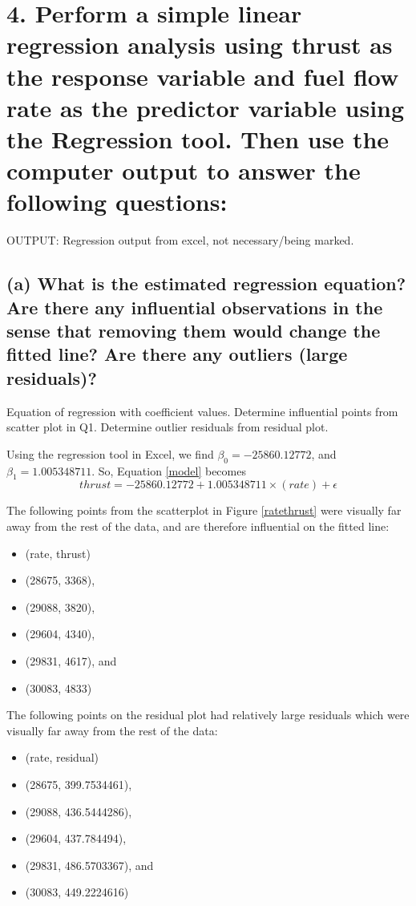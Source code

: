 \documentclass[letterpaper]{article}
\begin{document}
\section{4.	Perform a simple linear regression analysis using thrust as the response variable and fuel flow rate as the predictor variable using the Regression tool. Then use the computer output to answer the following questions:}
OUTPUT: Regression output from excel, not necessary/being marked.

\subsection{(a)	What is the estimated regression equation? Are there any influential observations  in the sense that removing them would change the fitted line? Are there any outliers (large residuals)?}
Equation of regression with coefficient values. Determine
influential points from scatter plot in Q1. Determine outlier residuals from residual plot.

Using the regression tool in Excel, we find $\beta_0=-25860.12772$, and
$\beta_1=1.005348711$.
So, Equation \ref{model} becomes
$$ thrust = -25860.12772 + 1.005348711 \times (rate) + \epsilon$$

The following points from the scatterplot in Figure \ref{ratethrust} were visually far
away from the rest of the data, and are therefore influential on the fitted line:
\begin{itemize}
 \item[] (rate, thrust)
 \item[] (28675, 3368),
 \item[] (29088, 3820),
 \item[] (29604, 4340),
 \item[] (29831, 4617), and
 \item[] (30083, 4833)
\end{itemize}

The following points on the residual plot had relatively large residuals which were
visually far away from the rest of the data:
\begin{itemize}
 \item[] (rate, residual)
 \item[] (28675, 399.7534461),
 \item[] (29088, 436.5444286),
 \item[] (29604, 437.784494),
 \item[] (29831, 486.5703367), and
 \item[] (30083, 449.2224616)
\end{itemize}
\end{document}
